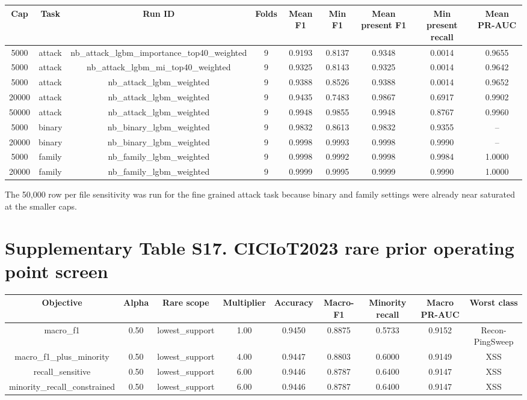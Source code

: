 \documentclass[10pt]{article}
\begin{document}
\begin{center}
\tiny
\setlength{\tabcolsep}{2pt}
\begin{longtable}{ccccccccc}
\toprule
Cap & Task & Run ID & Folds & Mean F1 & Min F1 & Mean present F1 & Min present recall & Mean PR-AUC \\
\midrule
\endhead
5000 & attack & nb\_attack\_lgbm\_importance\_top40\_weighted & 9 & 0.9193 & 0.8137 & 0.9348 & 0.0014 & 0.9655 \\
5000 & attack & nb\_attack\_lgbm\_mi\_top40\_weighted & 9 & 0.9325 & 0.8143 & 0.9325 & 0.0014 & 0.9642 \\
5000 & attack & nb\_attack\_lgbm\_weighted & 9 & 0.9388 & 0.8526 & 0.9388 & 0.0014 & 0.9652 \\
20000 & attack & nb\_attack\_lgbm\_weighted & 9 & 0.9435 & 0.7483 & 0.9867 & 0.6917 & 0.9902 \\
50000 & attack & nb\_attack\_lgbm\_weighted & 9 & 0.9948 & 0.9855 & 0.9948 & 0.8767 & 0.9960 \\
5000 & binary & nb\_binary\_lgbm\_weighted & 9 & 0.9832 & 0.8613 & 0.9832 & 0.9355 & -- \\
20000 & binary & nb\_binary\_lgbm\_weighted & 9 & 0.9998 & 0.9993 & 0.9998 & 0.9990 & -- \\
5000 & family & nb\_family\_lgbm\_weighted & 9 & 0.9998 & 0.9992 & 0.9998 & 0.9984 & 1.0000 \\
20000 & family & nb\_family\_lgbm\_weighted & 9 & 0.9999 & 0.9995 & 0.9999 & 0.9990 & 1.0000 \\
\bottomrule
\end{longtable}
\end{center}

The 50,000 row per file sensitivity was run for the fine grained attack task because binary and family settings were already near saturated at the smaller caps.

\section*{Supplementary Table S17. CICIoT2023 rare prior operating point screen}

\begin{center}
\tiny
\setlength{\tabcolsep}{2pt}
\begin{longtable}{ccccccccc}
\toprule
Objective & Alpha & Rare scope & Multiplier & Accuracy & Macro-F1 & Minority recall & Macro PR-AUC & Worst class \\
\midrule
\endhead
macro\_f1 & 0.50 & lowest\_support & 1.00 & 0.9450 & 0.8875 & 0.5733 & 0.9152 & Recon-PingSweep \\
macro\_f1\_plus\_minority & 0.50 & lowest\_support & 4.00 & 0.9447 & 0.8803 & 0.6000 & 0.9149 & XSS \\
recall\_sensitive & 0.50 & lowest\_support & 6.00 & 0.9446 & 0.8787 & 0.6400 & 0.9147 & XSS \\
minority\_recall\_constrained & 0.50 & lowest\_support & 6.00 & 0.9446 & 0.8787 & 0.6400 & 0.9147 & XSS \\
\bottomrule
\end{longtable}
\end{center}
\end{document}

